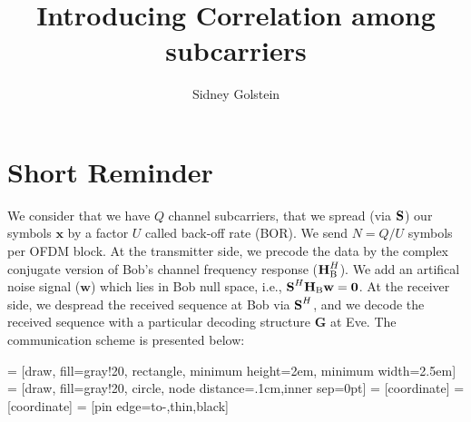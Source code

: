 \documentclass[12pt]{article}
\begin{document}
\title{\textbf{Introducing Correlation among subcarriers\\}}
\author{Sidney Golstein}
\maketitle



\section{Short Reminder}
We consider that we have $Q$ channel subcarriers, that we spread (via $\textbf{S}$) our symbols  $\textbf{x}$ by a factor $U$ called back-off rate (BOR). We send $N = Q/U$ symbols per OFDM block. At the transmitter side, we precode the data by the complex conjugate version of Bob's channel frequency response ($\textbf{H}_{\text{B}}^H$). We add an artifical noise signal ($\textbf{w}$) which lies in Bob null space, i.e., $\textbf{S}^H \textbf{H}_{\text{B}} \textbf{w} = \textbf{0}$. At the receiver side, we despread the received sequence at Bob via $\textbf{S}^H$, and we decode the received sequence with a particular decoding structure $\textbf{G}$ at Eve. The communication scheme is presented below:

 = [draw, fill=gray!20, rectangle, 
minimum height=2em, minimum width=2.5em]
 = [draw, fill=gray!20, circle, node distance=.1cm,inner sep=0pt]
 = [coordinate]
 = [coordinate]
 = [pin edge={to-,thin,black}]
\end{document}
